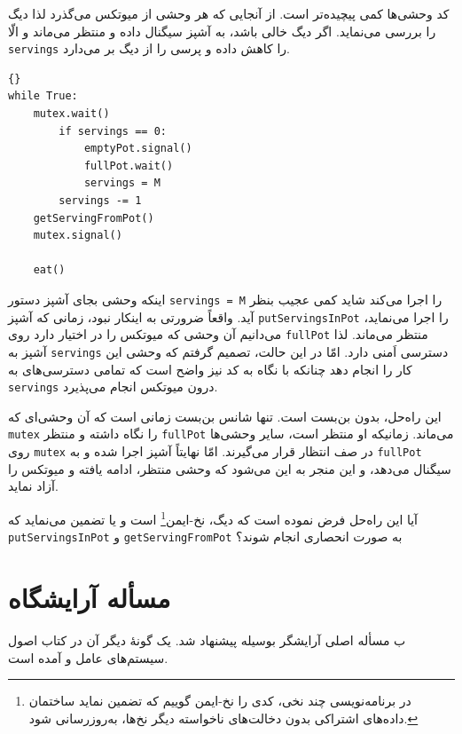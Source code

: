 \documentclass{book}
\newcommand{\clearemptydoublepage}{\newpage\cleardoublepage}
\begin{document}
    کد وحشی‌ها کمی پیچیده‌تر است. از آنجایی که هر وحشی از میوتکس می‌گذرد لذا دیگ را بررسی می‌نماید. 
    اگر دیگ خالی باشد، به آشپز سیگنال داده و منتظر می‌ماند و الّا  {\tt servings} را کاهش داده و پرسی را از دیگ بر می‌دارد. 

\begin{latin}
\begin{lstlisting}[title=\rl{راه‌‌حل غذاخوردن وحشی‌ها (وحشی)}]{}
while True:
    mutex.wait()
        if servings == 0:
            emptyPot.signal()
            fullPot.wait()
            servings = M
        servings -= 1
	getServingFromPot()
    mutex.signal()

    eat()
\end{lstlisting}
\end{latin}

    اینکه وحشی بجای آشپز دستور {\tt servings = M} را اجرا می‌کند شاید کمی عجیب بنظر آید. 
    واقعاً ضرورتی به اینکار نبود، زمانی که 
    آشپز {\tt putServingsInPot} را اجرا می‌نماید، می‌دانیم آن وحشی که میوتکس را در اختیار دارد 
    روی {\tt fullPot} منتظر می‌ماند. 
    لذا آشپز به  {\tt servings} دسترسی اَمنی دارد.  
    امّا در این حالت،‌ تصمیم گرفتم که وحشی این کار را انجام دهد چنانکه با نگاه به کد نیز 
    واضح است که تمامی دسترسی‌های به  {\tt servings} درون میوتکس انجام می‌پذیرد. 
    

    این راه‌حل، بدون بن‌بست است. 
    تنها شانس بن‌بست زمانی است که آن وحشی‌ای که {\tt mutex}  را نگاه داشته و منتظر {\tt fullPot} می‌ماند. 
    زمانیکه او منتظر است، سایر وحشی‌ها روی {\tt mutex} در صف انتظار قرار می‌گیرند. 
    امّا نهایتاً آشپز اجرا شده و به {\tt fullPot} سیگنال می‌دهد، 
    و این منجر به این می‌شود که  وحشی منتظر، ادامه یافته و میوتکس را آزاد نماید. 
    

    آیا این راه‌حل فرض نموده است که دیگ، نخ-ایمن\footnote{%
    در برنامه‌نویسی چند نخی، کدی را نخ-ایمن گوییم که تضمین نماید ساختمان داده‌های اشتراکی 
    بدون دخالت‌های ناخواسته دیگر نخ‌ها، به‌روزرسانی شود.%
    }  است و یا تضمین می‌نماید که  {\tt putServingsInPot} و {\tt getServingFromPot} 
    به صورت انحصاری انجام شوند؟


\clearemptydoublepage
\section{مسأله آرایشگاه}

ب    مسأله اصلی آرایشگر بوسیله  پیشنهاد شد. 
    یک گونهٔ دیگر آن در کتاب اصول سیستم‌های عامل  و 
    آمده است\cite{silberschatz}. 
\end{document}
